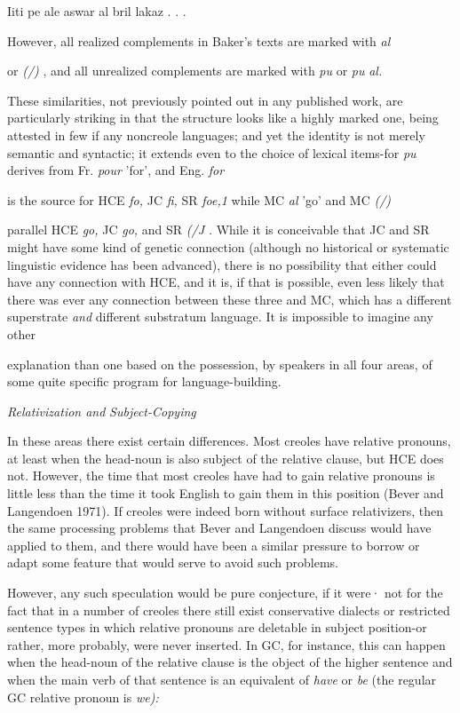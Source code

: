 \ea\label{ex:38}
 Iiti pe ale aswar al bril lakaz . . .
\glt
\z

However, all realized complements in Baker's texts are marked with \textit{al}

or \textit{(/)} , and all unrealized complements are marked with \textit{pu} or \textit{pu} \textit{al.}

These similarities, not previously pointed out in any published work, are particularly striking in that the structure looks like a highly marked one, being attested in few if any noncreole languages; and yet the identity is not merely semantic and syntactic; it extends even to the choice of lexical items-for \textit{pu} derives from Fr. \textit{pour} 'for', and Eng. \textit{for}

is the source for HCE \textit{fo,} JC \textit{fi,} SR \textit{foe,1 }while MC \textit{al} 'go' and MC \textit{(/)}

parallel HCE \textit{go,} JC \textit{go,} and SR \textit{(/J} \textit{.} While it is conceivable that JC and SR might have some kind of genetic connection (although no historical or systematic linguistic evidence has been advanced), there is no possi\-bility that either could have any connection with HCE, and it is, if that is possible, even less likely that there was ever any connection between these three and MC, which has a different superstrate \textit{and} different substratum language. It is impossible to imagine any other


explanation than one based on the possession, by speakers in all four areas, of some quite specific program for language-building.

\textit{Relativization and }\textit{Subject-Copying}

In these areas there exist certain differences. Most creoles have relative pronouns, at least when the head-noun is also subject of the relative clause, but HCE does not. However, the time that most creoles have had to gain relative pronouns is little less than the time it took English to gain them in this position (Bever and Langendoen 1971). If creoles were indeed born without surface relativizers, then the same processing problems that Bever and Langendoen discuss would have applied to them, and there would have been a similar pressure to borrow or adapt some feature that would serve to avoid such problems.

However, any such speculation would be pure conjecture, if it were· not for the fact that in a number of creoles there still exist con\-servative dialects or restricted sentence types in which relative pronouns are deletable in subject position-or rather, more probably, were never inserted. In GC, for instance, this can happen when the head-noun of the relative clause is the object of the higher sentence and when the main verb of that sentence is an equivalent of \textit{have} or \textit{be} (the regular GC relative pronoun is \textit{we):}

